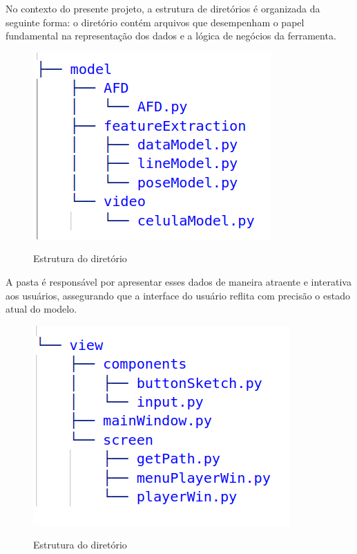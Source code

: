 No contexto do presente projeto, a estrutura de diretórios é organizada da seguinte forma: o diretório  contém arquivos que desempenham o papel fundamental na representação dos dados e a lógica de negócios da ferramenta.

\begin{figure}[H]
    \centering
    \caption{Estrutura do diretório }
    \includegraphics[scale=0.5]{figuras/diretorios/model.png}
    \label{fig:model}
\end{figure}



A pasta  é responsável por apresentar esses dados de maneira atraente e interativa aos usuários, assegurando que a interface do usuário reflita com precisão o estado atual do modelo.

\begin{figure}[H]
	\centering
	\caption{Estrutura do diretório }
	\includegraphics[scale=0.5]{figuras/diretorios/view.png}
	\label{fig:view}
\end{figure}

